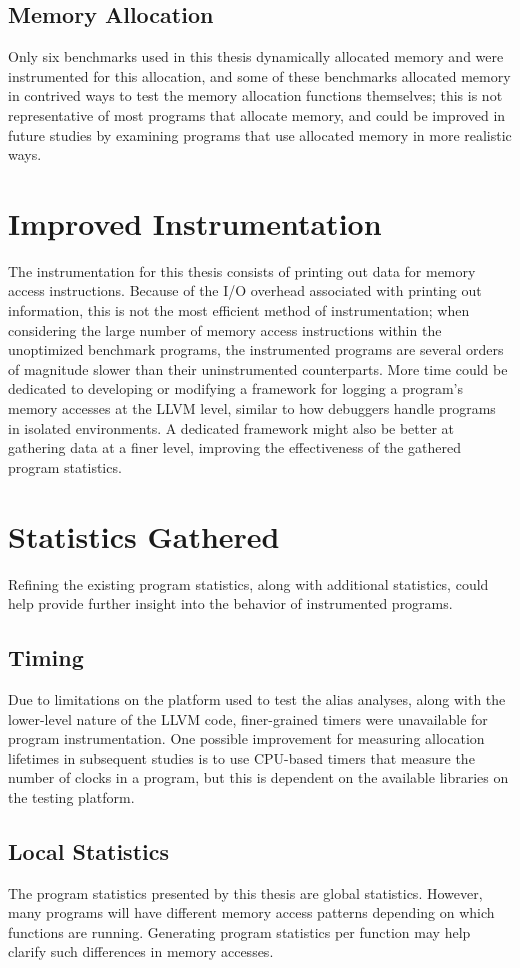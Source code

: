 \subsection{Memory Allocation}
Only six benchmarks used in this thesis dynamically allocated memory and were instrumented for this allocation, and some of these benchmarks allocated memory in contrived ways to test the memory allocation functions themselves; this is not representative of most programs that allocate memory, and could be improved in future studies by examining programs that use allocated memory in more realistic ways.

\section{Improved Instrumentation}
The instrumentation for this thesis consists of printing out data for memory access instructions. Because of the I/O overhead associated with printing out information, this is not the most efficient method of instrumentation; when considering the large number of memory access instructions within the unoptimized benchmark programs, the instrumented programs are several orders of magnitude slower than their uninstrumented counterparts. More time could be dedicated to developing or modifying a framework for logging a program's memory accesses at the LLVM level, similar to how debuggers handle programs in isolated environments. A dedicated framework might also be better at gathering data at a finer level, improving the effectiveness of the gathered program statistics.

\section{Statistics Gathered}
Refining the existing program statistics, along with additional statistics, could help provide further insight into the behavior of instrumented programs.

\subsection{Timing}
Due to limitations on the platform used to test the alias analyses, along with the lower-level nature of the LLVM code, finer-grained timers were unavailable for program instrumentation. One possible improvement for measuring allocation lifetimes in subsequent studies is to use CPU-based timers that measure the number of clocks in a program, but this is dependent on the available libraries on the testing platform.

\subsection{Local Statistics}
The program statistics presented by this thesis are global statistics. However, many programs will have different memory access patterns depending on which functions are running. Generating program statistics per function may help clarify such differences in memory accesses.
